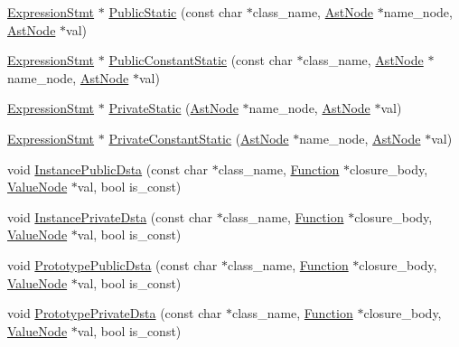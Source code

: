 \begin{DoxyCompactItemize}
\item 
\hyperlink{classmocha_1_1_expression_stmt}{ExpressionStmt} $\ast$ \hyperlink{classmocha_1_1_class_processor_utils_a28a8c9dae3d507054c521d4b8f5e1830}{PublicStatic} (const char $\ast$class\_\-name, \hyperlink{classmocha_1_1_ast_node}{AstNode} $\ast$name\_\-node, \hyperlink{classmocha_1_1_ast_node}{AstNode} $\ast$val)
\item 
\hyperlink{classmocha_1_1_expression_stmt}{ExpressionStmt} $\ast$ \hyperlink{classmocha_1_1_class_processor_utils_a3d84ff9ef3f2d4082396169e1b99f6bb}{PublicConstantStatic} (const char $\ast$class\_\-name, \hyperlink{classmocha_1_1_ast_node}{AstNode} $\ast$name\_\-node, \hyperlink{classmocha_1_1_ast_node}{AstNode} $\ast$val)
\item 
\hyperlink{classmocha_1_1_expression_stmt}{ExpressionStmt} $\ast$ \hyperlink{classmocha_1_1_class_processor_utils_ac59461d97ab0bb6da1f1ad0024e85e1f}{PrivateStatic} (\hyperlink{classmocha_1_1_ast_node}{AstNode} $\ast$name\_\-node, \hyperlink{classmocha_1_1_ast_node}{AstNode} $\ast$val)
\item 
\hyperlink{classmocha_1_1_expression_stmt}{ExpressionStmt} $\ast$ \hyperlink{classmocha_1_1_class_processor_utils_ab81285773872b9fb9cdd7ceb33ad6f2a}{PrivateConstantStatic} (\hyperlink{classmocha_1_1_ast_node}{AstNode} $\ast$name\_\-node, \hyperlink{classmocha_1_1_ast_node}{AstNode} $\ast$val)
\item 
void \hyperlink{classmocha_1_1_class_processor_utils_afeb3b1bdc113c10b8417e1e9d217042a}{InstancePublicDsta} (const char $\ast$class\_\-name, \hyperlink{classmocha_1_1_function}{Function} $\ast$closure\_\-body, \hyperlink{classmocha_1_1_value_node}{ValueNode} $\ast$val, bool is\_\-const)
\item 
void \hyperlink{classmocha_1_1_class_processor_utils_a2b746fe441de3ed55f5ec11f6f5172d8}{InstancePrivateDsta} (const char $\ast$class\_\-name, \hyperlink{classmocha_1_1_function}{Function} $\ast$closure\_\-body, \hyperlink{classmocha_1_1_value_node}{ValueNode} $\ast$val, bool is\_\-const)
\item 
void \hyperlink{classmocha_1_1_class_processor_utils_ad30031d6087cd77d4d2cc6763c05352f}{PrototypePublicDsta} (const char $\ast$class\_\-name, \hyperlink{classmocha_1_1_function}{Function} $\ast$closure\_\-body, \hyperlink{classmocha_1_1_value_node}{ValueNode} $\ast$val, bool is\_\-const)
\item 
void \hyperlink{classmocha_1_1_class_processor_utils_ac3bfe46eb0acef03d504b0c6724fb7b4}{PrototypePrivateDsta} (const char $\ast$class\_\-name, \hyperlink{classmocha_1_1_function}{Function} $\ast$closure\_\-body, \hyperlink{classmocha_1_1_value_node}{ValueNode} $\ast$val, bool is\_\-const)

\end{DoxyCompactItemize}
